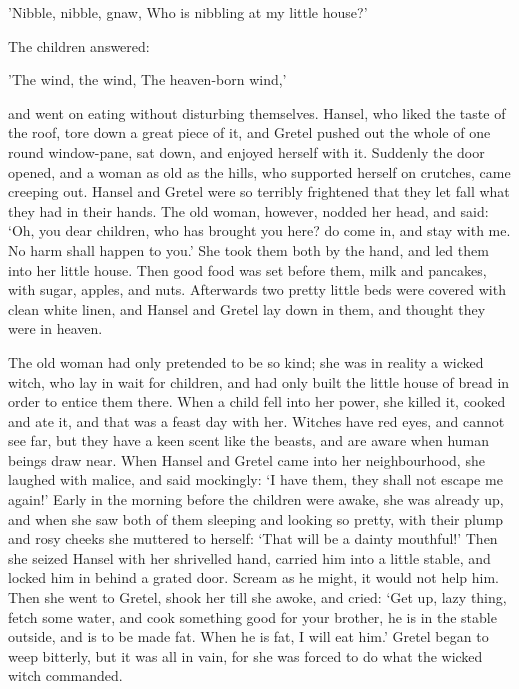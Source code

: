 \documentclass[oneside,11pt]{memoir} %
\begin{document}
'Nibble, nibble, gnaw,
Who is nibbling at my little house?'

The children answered:

'The wind, the wind,
The heaven-born wind,'

and went on eating without disturbing themselves. Hansel, who liked the taste of the roof, tore down a great piece of it, and Gretel pushed out the whole of one round window-pane, sat down, and enjoyed herself with it. Suddenly the door opened, and a woman as old as the hills, who supported herself on crutches, came creeping out. Hansel and Gretel were so terribly frightened that they let fall what they had in their hands. The old woman, however, nodded her head, and said: `Oh, you dear children, who has brought you here? do come in, and stay with me. No harm shall happen to you.' She took them both by the hand, and led them into her little house. Then good food was set before them, milk and pancakes, with sugar, apples, and nuts. Afterwards two pretty little beds were covered with clean white linen, and Hansel and Gretel lay down in them, and thought they were in heaven.

The old woman had only pretended to be so kind; she was in reality a wicked witch, who lay in wait for children, and had only built the little house of bread in order to entice them there. When a child fell into her power, she killed it, cooked and ate it, and that was a feast day with her. Witches have red eyes, and cannot see far, but they have a keen scent like the beasts, and are aware when human beings draw near. When Hansel and Gretel came into her neighbourhood, she laughed with
malice, and said mockingly: `I have them, they shall not escape me again!' Early in the morning before the children were awake, she was already up, and when she saw both of them sleeping and looking so pretty, with their plump and rosy cheeks she muttered to herself: `That will be a dainty mouthful!' Then she seized Hansel with her shrivelled hand, carried him into a little stable, and locked him in behind a grated door. Scream as he might, it would not help him. Then she went to
Gretel, shook her till she awoke, and cried: `Get up, lazy thing, fetch some water, and cook something good for your brother, he is in the stable outside, and is to be made fat. When he is fat, I will eat him.' Gretel began to weep bitterly, but it was all in vain, for she was forced to do what the wicked witch commanded.
\end{document}
